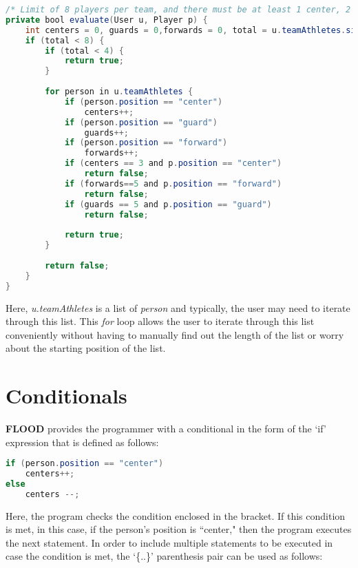 \documentclass[12pt]{report}
\begin{document}
\begin{lstlisting}[language=Java,label=some-code,caption=While loop]
/* Limit of 8 players per team, and there must be at least 1 center, 2 guards and 2 forwards per team. */
private bool evaluate(User u, Player p) {
	int centers = 0, guards = 0,forwards = 0, total = u.teamAthletes.size();
	if (total < 8) {
		if (total < 4) {
			return true;
		}
		
		for person in u.teamAthletes {
			if (person.position == "center")
				centers++;
			if (person.position == "guard")
				guards++;
			if (person.position == "forward")
				forwards++;
			if (centers == 3 and p.position == "center")
				return false;
			if (forwards==5 and p.position == "forward")
				return false;
			if (guards == 5 and p.position == "guard")
				return false;
		
			return true;
		}
		
		return false;
	}
}
\end{lstlisting}

\begin{doublespace}
Here, \textit{u.teamAthletes} is a list of \textit{person} and typically, the user may need to iterate through this list. This \textit{for} loop allows the user to iterate through this list conveniently without having to manually find out the length of the list or worry about the starting position of the list.
\end{doublespace}

\section{Conditionals}

\begin{doublespace}
\textbf{FLOOD} provides the programmer with a conditional in the form of the `if' expression that is defined as follows:
\end{doublespace}

\begin{lstlisting}[language=Java,label=some-code,caption=While loop]
if (person.position == "center")
	centers++;
else
	centers --;
\end{lstlisting}

\begin{doublespace}
Here, the program checks the condition enclosed in the bracket. If this condition is met, in this case, if the person's position is ``center," then the program executes the next statement. In order to include multiple statements to be executed in case the condition is met, the `\{..\}'
parenthesis pair can be used as follows:
\end{doublespace}
\end{document}
